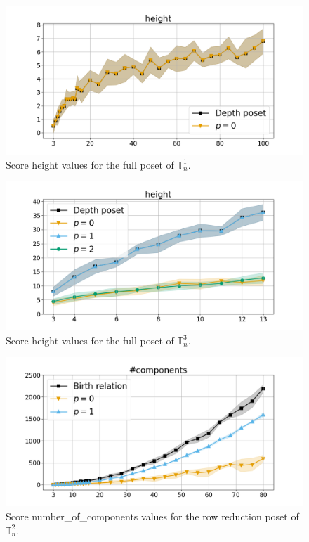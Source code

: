 \documentclass{article}
\begin{document}
    \begin{figure}[h!]
        \centering
        \hspace*{-0.24\textwidth}
        \includegraphics[width=1.4\textwidth]{pics/extended torus scores/score=height, dim=1, object=full.png}
        \caption{Score height values for the full poset of $\mathbb{T}_n^{1}$.}
        \label{fig:height-full1}
    \end{figure}
    \begin{figure}[h!]
        \centering
        \hspace*{-0.24\textwidth}
        \includegraphics[width=1.4\textwidth]{pics/extended torus scores/score=height, dim=3, object=full.png}
        \caption{Score height values for the full poset of $\mathbb{T}_n^{3}$.}
        \label{fig:height-full3}
    \end{figure}
    \begin{figure}[h!]
        \centering
        \hspace*{-0.24\textwidth}
        \includegraphics[width=1.4\textwidth]{pics/extended torus scores/score=number-of-components, dim=2, object=row reduction.png}
        \caption{Score number\_of\_components values for the row reduction poset of $\mathbb{T}_n^{2}$.}
        \label{fig:numberofcomponents-rowreduction2}
    \end{figure}
\end{document}
